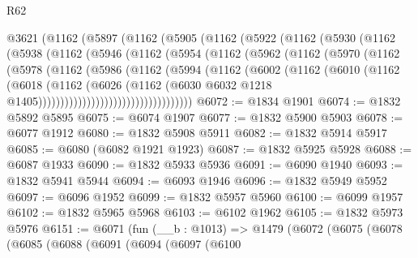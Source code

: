 \begin{lexlean}{R62}
\begin{coremodule}
    @3621
      (@1162
        (@5897
          (@1162
            (@5905
              (@1162
                (@5922
                  (@1162
                    (@5930
                      (@1162
                        (@5938
                          (@1162
                            (@5946
                              (@1162
                                (@5954
                                  (@1162
                                    (@5962
                                      (@1162
                                        (@5970
                                          (@1162
                                            (@5978
                                              (@1162
                                                (@5986
                                                  (@1162
                                                    (@5994
                                                      (@1162
                                                        (@6002
                                                          (@1162
                                                            (@6010
                                                              (@1162
                                                                (@6018
                                                                  (@1162
                                                                    (@6026
                                                                      (@1162
                                                                        (@6030
                                                                          @6032
                                                                          @1218
                                                                          @1405)))))))))))))))))))))))))))))))))))
@6072 := @1834 @1901
@6074 := @1832 @5892 @5895
@6075 := @6074 @1907
@6077 := @1832 @5900 @5903
@6078 := @6077 @1912
@6080 := @1832 @5908 @5911
@6082 := @1832 @5914 @5917
@6085 := @6080 (@6082 @1921 @1923)
@6087 := @1832 @5925 @5928
@6088 := @6087 @1933
@6090 := @1832 @5933 @5936
@6091 := @6090 @1940
@6093 := @1832 @5941 @5944
@6094 := @6093 @1946
@6096 := @1832 @5949 @5952
@6097 := @6096 @1952
@6099 := @1832 @5957 @5960
@6100 := @6099 @1957
@6102 := @1832 @5965 @5968
@6103 := @6102 @1962
@6105 := @1832 @5973 @5976
@6151 := @6071
    (fun (__b : @1013) =>
    @1479
      (@6072
        (@6075
          (@6078
            (@6085
              (@6088
                (@6091
                  (@6094
                    (@6097
                      (@6100

\end{coremodule}
\end{lexlean}
